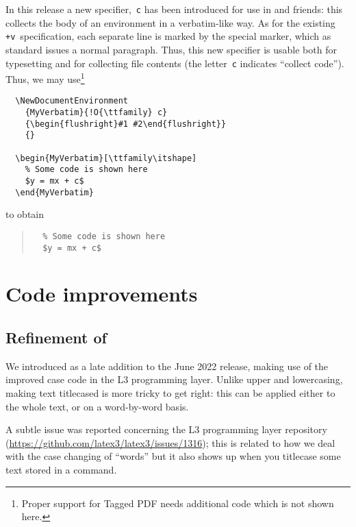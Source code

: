 \documentclass{ltnews}
\begin{document}
In this release a new specifier,~\texttt{c} has been introduced for
use in  and friends: this collects the body
of an environment in a verbatim-like way.  As for the existing
\texttt{+v}~specification, each separate line is marked by the special
 marker, which as standard issues a normal
paragraph. Thus, this new specifier is usable both for typesetting and
for collecting file contents (the letter~\texttt{c} indicates
\enquote{collect code}).  Thus, we may use\footnote{Proper support 
for Tagged PDF needs additional code which is not shown here.}
\begin{verbatim}
  \NewDocumentEnvironment
    {MyVerbatim}{!O{\ttfamily} c}
    {\begin{flushright}#1 #2\end{flushright}}
    {}
    
  \begin{MyVerbatim}[\ttfamily\itshape]
    % Some code is shown here
    $y = mx + c$
  \end{MyVerbatim}
\end{verbatim}
to obtain
\begin{quote}
\makeatletter
\def\@verbatim{%
  \trivlist
  \raggedleft
  \let \do \@makeother
  \dospecials
  \obeylines
  \normalfont \ttfamily \itshape
  \@noligs
}
\begin{verbatim}
  % Some code is shown here
  $y = mx + c$
\end{verbatim}
\end{quote}



\section{Code improvements}

\subsection{Refinement of }

We introduced  as a late addition to the June 2022
release, making use of the improved case code in the L3 programming
layer. Unlike upper and lowercasing, making text titlecased is more
tricky to get right: this can be applied either to the whole text, or
on a word-by-word basis.

A subtle issue was reported concerning the L3 programming layer
repository (\url{https://github.com/latex3/latex3/issues/1316}); this
is related to how we deal with the case changing of \enquote{words}
but it also shows up when you titlecase some text stored in a command.
\end{document}

